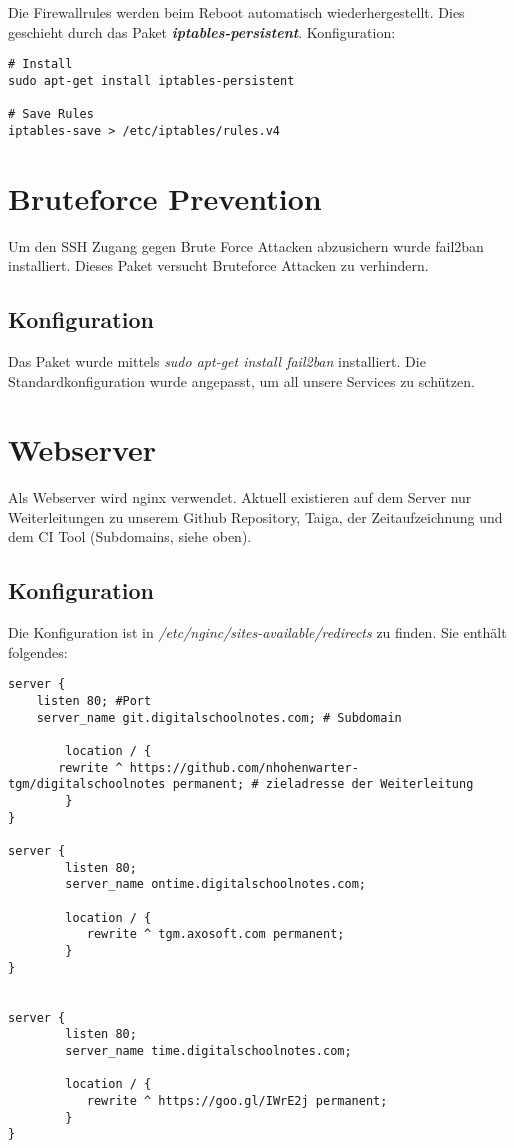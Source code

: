 \documentclass[12pt,a4paper,oneside,ngerman]{scrartcl}
\begin{document}
Die Firewallrules werden beim Reboot automatisch wiederhergestellt. Dies geschieht durch das Paket \textbf{\textit{iptables-persistent}}. Konfiguration\cite{HOWTO:2}:

\begin{lstlisting}
# Install
sudo apt-get install iptables-persistent

# Save Rules
iptables-save > /etc/iptables/rules.v4
\end{lstlisting}

\section{Bruteforce Prevention}
Um den SSH Zugang gegen Brute Force Attacken abzusichern wurde fail2ban installiert. Dieses Paket versucht Bruteforce Attacken zu verhindern. \cite{HOWTO:1} \\

\subsection{Konfiguration}
Das Paket wurde mittels \textit{sudo apt-get install fail2ban} installiert. Die Standardkonfiguration wurde angepasst, um all unsere Services zu schützen.

\section{Webserver}
Als Webserver wird nginx verwendet. Aktuell existieren auf dem Server nur Weiterleitungen zu unserem Github Repository, Taiga, der Zeitaufzeichnung und dem CI Tool (Subdomains, siehe oben).

\subsection{Konfiguration}
Die Konfiguration ist in \textit{/etc/nginc/sites-available/redirects} zu finden. Sie enthält folgendes:

\begin{lstlisting}
server {
	listen 80; #Port
	server_name git.digitalschoolnotes.com; # Subdomain

    	location / {
	   rewrite ^ https://github.com/nhohenwarter-tgm/digitalschoolnotes permanent; # zieladresse der Weiterleitung
    	}
}

server {
        listen 80;
        server_name ontime.digitalschoolnotes.com;

        location / {
           rewrite ^ tgm.axosoft.com permanent;
        }
}


server {
        listen 80;
        server_name time.digitalschoolnotes.com;

        location / {
           rewrite ^ https://goo.gl/IWrE2j permanent;
        }
}

\end{lstlisting}
\end{document}
